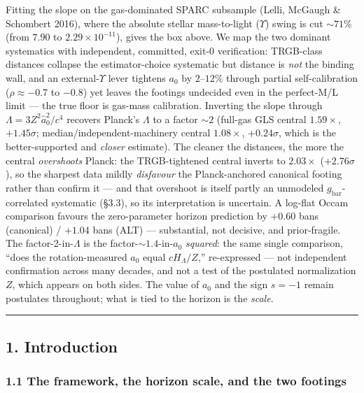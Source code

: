 \documentclass[
]{article}
\begin{document}
Fitting the slope on the gas-dominated SPARC subsample (Lelli, McGaugh
\& Schombert 2016), where the absolute stellar mass-to-light
(\(\Upsilon\)) swing is cut \(\sim71\%\) (from \(7.90\) to
\(2.29\times10^{-11}\)), gives the box above. We map the two dominant
systematics with independent, committed, exit-0 verification: TRGB-class
distances collapse the estimator-choice systematic but distance is
\emph{not} the binding wall, and an external-\(\Upsilon\) lever tightens
\(a_0\) by \(2\)--\(12\%\) through partial self-calibration
(\(\rho\approx-0.7\) to \(-0.8\)) yet leaves the footings undecided even
in the perfect-M/L limit --- the true floor is gas-mass calibration.
Inverting the slope through \(\Lambda=3Z^2\hat a_0^2/c^4\) recovers
Planck's \(\Lambda\) to a factor \(\sim2\) (full-gas GLS central
\(1.59\times\), \(+1.45\sigma\); median/independent-machinery central
\(1.08\times\), \(+0.24\sigma\), which is the better-supported and
\emph{closer} estimate). The cleaner the distances, the more the central
\emph{overshoots} Planck: the TRGB-tightened central inverts to
\(2.03\times\) (\(+2.76\sigma\)), so the sharpest data mildly
\emph{disfavour} the Planck-anchored canonical footing rather than
confirm it --- and that overshoot is itself partly an unmodeled
\(g_\mathrm{bar}\)-correlated systematic (§3.3), so its interpretation is
uncertain. A log-flat Occam comparison favours the zero-parameter
horizon prediction by \(+0.60\) bans (canonical) / \(+1.04\) bans (ALT)
--- substantial, not decisive, and prior-fragile. The
factor-2-in-\(\Lambda\) is the factor-\(\sim1.4\)-in-\(a_0\)
\emph{squared}: the same single comparison, ``does the rotation-measured
\(a_0\) equal \(cH_\Lambda/Z\),'' re-expressed --- not independent
confirmation across many decades, and not a test of the postulated
normalization \(Z\), which appears on both sides. The value of \(a_0\)
and the sign \(s=-1\) remain postulates throughout; what is tied to the
horizon is the \emph{scale}.

\begin{center}\rule{0.5\linewidth}{0.5pt}\end{center}

\subsection{1. Introduction}\label{introduction}

\subsubsection{1.1 The framework, the horizon scale, and the two
footings}\label{the-framework-the-horizon-scale-and-the-two-footings}
\end{document}
